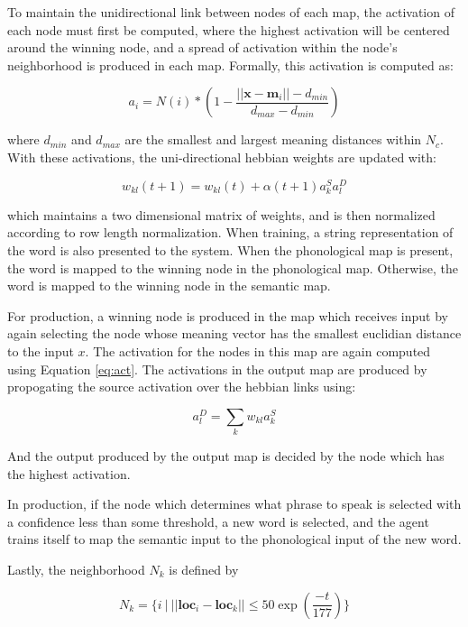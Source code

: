 \documentclass[a4paper,11pt]{article}
\begin{document}
To maintain the unidirectional link between nodes of each map, the activation of
each node must first be computed, where the highest activation will be centered
around the winning node, and a spread of activation within the node's
neighborhood is produced in each map.  Formally, this activation is computed as:

\begin{equation}\label{eq:act}
a_i = N(i)*(1 - \frac{||\textbf{x} - \textbf{m$_i$}|| - d_{min} }{d_{max} -
d_{min}})
\end{equation}

where $d_{min}$ and $d_{max}$ are the smallest and largest meaning distances
within $N_c$.  With these activations, the uni-directional hebbian weights are
updated with:

\begin{equation}\label{eq:heb_weight}
w_{kl}(t+1) = w_{kl}(t) + \alpha(t+1)a_k^Sa_l^D
\end{equation}

which maintains a two dimensional matrix of weights, and is then normalized
according to row length normalization.  When training, a string representation
of the word is also presented to the system.  When the phonological map 
is present, the word is mapped to the winning node in the phonological map.
Otherwise, the word is mapped to the winning node in the semantic map.


For production, a winning node is produced in the map which receives input by
again selecting the node whose meaning vector has the smallest euclidian
distance to the input $x$.  The activation for the nodes in this map are again
computed using Equation \ref{eq:act}.  The activations in the output map are
produced by propogating the source activation over the hebbian links using:

\begin{equation}\label{eq:prop}
a_l^D = \sum_k w_{kl}a_k^S
\end{equation}

And the output produced by the output map is decided by the node which has the
highest activation.

In production, if the node which determines what phrase to speak is selected with a
confidence less than some threshold, a new word is selected, and the agent
trains itself to map the semantic input to the phonological input of the new
word.

Lastly, the neighborhood $N_k$ is defined by

\begin{equation}\label{eq:neighbors}
N_k = \{ i \:| \:|| \textbf{loc$_i$} - \textbf{loc$_k$} || \leq 50\exp(\frac
{-t}{177})\}
\end{equation}
\end{document}
